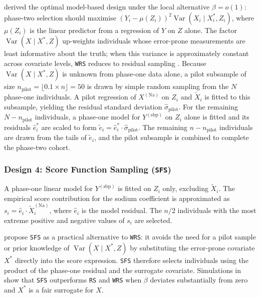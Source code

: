 \citet{tao2019optimal} derived the optimal model-based design under the local alternative $\beta = o(1)$: phase-two selection should maximise $(Y_i - \mu(Z_i))^2 \operatorname{Var}(X_i \mid X^*_i, Z_i)$, where $\mu(Z_i)$ is the linear predictor from a regression of $Y$ on $Z$ alone. The factor $\operatorname{Var}(X \mid X^*, Z)$ up-weights individuals whose error-prone measurements are least informative about the truth; when this variance is approximately constant across covariate levels, \texttt{WRS} reduces to residual sampling \citep[Section~3.1]{amorim2021two}. Because $\operatorname{Var}(X \mid X^*, Z)$ is unknown from phase-one data alone, a pilot subsample of size $n_{\mathrm{pilot}} = \lfloor 0.1 \times n \rfloor = 50$ is drawn by simple random sampling from the $N$ phase-one individuals. A pilot regression of $X^{(\mathrm{Na})}$ on $Z_i$ and $\tilde{X}_i$ is fitted to this subsample, yielding the residual standard deviation $\hat{\sigma}_{\mathrm{pilot}}$. For the remaining $N - n_{\mathrm{pilot}}$ individuals, a phase-one model for $Y^{(\mathrm{sbp})}$ on $Z_i$ alone is fitted and its residuals $\hat{e}^*_i$ are scaled to form $\tilde{e}_i = \hat{e}^*_i \cdot \hat{\sigma}_{\mathrm{pilot}}$. The remaining $n - n_{\mathrm{pilot}}$ individuals are drawn from the tails of $\tilde{e}_i$, and the pilot subsample is combined to complete the phase-two cohort.

\subsubsection{Design 4: Score Function Sampling (\texttt{SFS})}

A phase-one linear model for $Y^{(\mathrm{sbp})}$ is fitted on $Z_i$ only, excluding $\tilde{X}_i$. The empirical score contribution for the sodium coefficient is approximated as $s_i = \hat{e}_i \cdot \tilde{X}_i^{(\mathrm{Na})}$, where $\hat{e}_i$ is the model residual. The $n/2$ individuals with the most extreme positive and negative values of $s_i$ are selected.

\citet{amorim2021two} propose \texttt{SFS} as a practical alternative to \texttt{WRS}: it avoids the need for a pilot sample or prior knowledge of $\operatorname{Var}(X \mid X^*, Z)$ by substituting the error-prone covariate $X^*$ directly into the score expression. \texttt{SFS} therefore selects individuals using the product of the phase-one residual and the surrogate covariate. Simulations in \citet[Table~1]{amorim2021two} show that \texttt{SFS} outperforms \texttt{RS} and \texttt{WRS} when $\beta$ deviates substantially from zero and $X^*$ is a fair surrogate for $X$.

